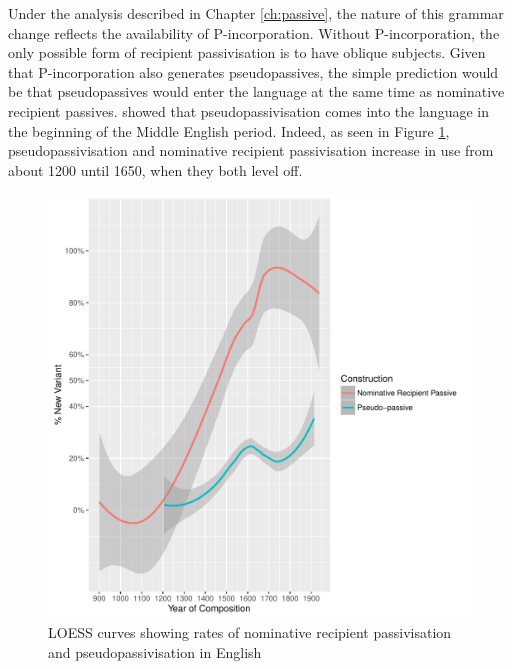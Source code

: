 	Under the analysis described in Chapter \ref{ch:passive}, the nature of this grammar change reflects the availability of P-incorporation. Without P-incorporation, the only possible form of recipient passivisation is to have oblique subjects. Given that P-incorporation also generates pseudopassives, the simple prediction would be that pseudopassives would enter the language at the same time as nominative recipient passives. \cite{Sigursson.2014} showed that pseudopassivisation comes into the language in the beginning of the Middle English period. Indeed, as seen in Figure \ref{fig:recpas-pseudo}, pseudopassivisation and nominative recipient passivisation increase in use from about 1200 until 1650, when they both level off.

	\begin{figure}[ht!]
		\includegraphics[width=\linewidth]{../images/recpas-pseudo}
		\caption{LOESS curves showing rates of nominative recipient passivisation and pseudopassivisation in English}
		\label{fig:recpas-pseudo}
	\end{figure}

